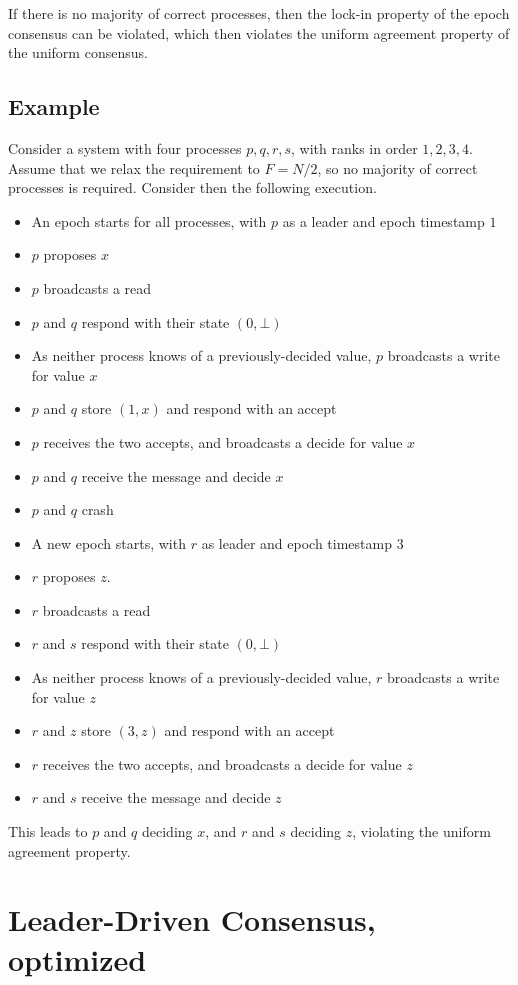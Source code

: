 \documentclass[a4paper]{scrreprt}
\begin{document}
If there is no majority of correct processes, then the lock-in property of the
epoch consensus can be violated, which then violates the uniform agreement
property of the uniform consensus.

\subsection{Example}

Consider a system with four processes $p, q, r, s$, with ranks in order $1, 2,
3, 4$. Assume that we relax the requirement to $F = N/2$, so no majority of
correct processes is required. Consider then the following execution.

\begin{itemize}
	\item An epoch starts for all processes, with $p$ as a leader and epoch
		timestamp $1$
	\item $p$ proposes $x$
	\item $p$ broadcasts a read
	\item $p$ and $q$ respond with their state $(0, \bot)$
	\item As neither process knows of a previously-decided value, $p$
		broadcasts a write for value $x$
	\item $p$ and $q$ store $(1, x)$ and respond with an accept
	\item $p$ receives the two accepts, and broadcasts a decide for value
		$x$
	\item $p$ and $q$ receive the message and decide $x$
	\item $p$ and $q$ crash
	\item A new epoch starts, with $r$ as leader and epoch timestamp $3$
	\item $r$ proposes $z$.
	\item $r$ broadcasts a read
	\item $r$ and $s$ respond with their state $(0, \bot)$
	\item As neither process knows of a previously-decided value, $r$
		broadcasts a write for value $z$
	\item $r$ and $z$ store $(3, z)$ and respond with an accept
	\item $r$ receives the two accepts, and broadcasts a decide for value
		$z$
	\item $r$ and $s$ receive the message and decide $z$
\end{itemize}

This leads to $p$ and $q$ deciding $x$, and $r$ and $s$ deciding $z$, violating
the uniform agreement property.

\section{Leader-Driven Consensus, optimized}
\end{document}
